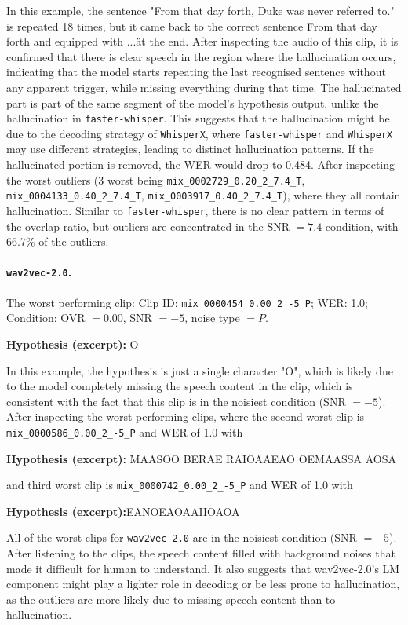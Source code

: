 In this example, the sentence "From that day forth, Duke was never referred to." is repeated 18 times, but it came back to the correct sentence \"From that day forth and equipped with ...\" at the end. After inspecting the audio of this clip, it is confirmed that there is clear speech in the region where the hallucination occurs, indicating that the model starts repeating the last recognised sentence without any apparent trigger, while missing everything during that time. The hallucinated part is part of the same segment of the model's hypothesis output, unlike the hallucination in \texttt{faster-whisper}. This suggests that the hallucination might be due to the decoding strategy of \texttt{WhisperX}, where \texttt{faster-whisper} and \texttt{WhisperX} may use different strategies, leading to distinct hallucination patterns. If the hallucinated portion is removed, the WER would drop to 0.484. After inspecting the worst outliers (3 worst being  \texttt{mix\_0002729\_0.20\_2\_7.4\_T}, \texttt{mix\_0004133\_0.40\_2\_7.4\_T}, \texttt{mix\_0003917\_0.40\_2\_7.4\_T}), where they all contain hallucination. Similar to \texttt{faster-whisper}, there is no clear pattern in terms of the overlap ratio, but outliers are concentrated in the SNR $=7.4$ condition, with 66.7\% of the outliers.

\paragraph{\texttt{wav2vec-2.0}.} The worst performing clip:
Clip ID: \texttt{mix\_0000454\_0.00\_2\_-5\_P}; WER: 1.0; Condition: OVR $=0.00$, SNR $=-5$, noise type $=P$.
\begin{asrexample}
\footnotesize
\textbf{Hypothesis (excerpt):}
O
\end{asrexample}

In this example, the hypothesis is just a single character "O", which is likely due to the model completely missing the speech content in the clip, which is consistent with the fact that this clip is in the noisiest condition (SNR $=-5$). After inspecting the worst performing clips, where the second worst clip is \texttt{mix\_0000586\_0.00\_2\_-5\_P} and WER of 1.0 with 
\begin{asrexample}
\footnotesize
\textbf{Hypothesis (excerpt):}
MAASOO BERAE RAIOAAEAO OEMAASSA AOSA
\end{asrexample}
and third worst clip is \texttt{mix\_0000742\_0.00\_2\_-5\_P} and WER of 1.0 with 
\begin{asrexample}
\footnotesize
\textbf{Hypothesis (excerpt):}EANOEAOAAIIOAOA
\end{asrexample}
All of the worst clips for \texttt{wav2vec-2.0} are in the noisiest condition (SNR $=-5$). After listening to the clips, the speech content filled with background noises that made it difficult for human to understand. It also suggests that wav2vec-2.0's LM component might play a lighter role in decoding or be less prone to hallucination, as the outliers are more likely due to missing speech content than to hallucination. 


